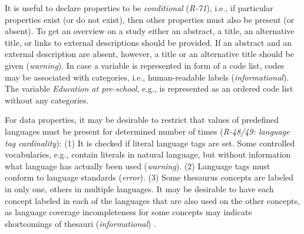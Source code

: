 \documentclass[conference]{IEEEtran}
\newenvironment{DL}{
  \small
  \vspace{0cm}
	\begin{center}
  \begin{tabular}{c l}

}{
  \end{tabular}
	\end{center}
}
\begin{document}
It is useful to declare properties to be \emph{conditional} (\emph{R-71}), i.e., if particular properties exist (or do not exist), then other properties must also be present (or absent).
To get an overview on a study either an abstract, a title, an alternative title, or links to external descriptions should be provided. 
If an abstract and an external description are absent, however,  
a title or an alternative title should be given (\emph{warning}).
In case a variable is represented in form of a code list, codes may be associated with categories, i.e., human-readable labels (\emph{informational}).
The variable \emph{Education at pre-school}, e.g., is represented as an ordered code list without any categories.

For data properties, it may be desirable to restrict that values of predefined languages must be present for determined number of times (\emph{R-48/49: language tag cardinality}):
(1) It is checked if literal language tags are set. Some controlled vocabularies, e.g., contain literals in natural language, but without information what language has actually been used (\emph{warning}). 
(2) Language tags must conform to language standards (\emph{error}). 
(3) Some thesaurus concepts are labeled in only one, others in multiple languages. 
It may be desirable to have each concept labeled in each of the languages that are also used on the other concepts,
as language coverage incompleteness for some concepts may indicate shortcomings of thesauri (\emph{informational})
\cite{MaderHaslhoferIsaac2012}.



\end{document}
